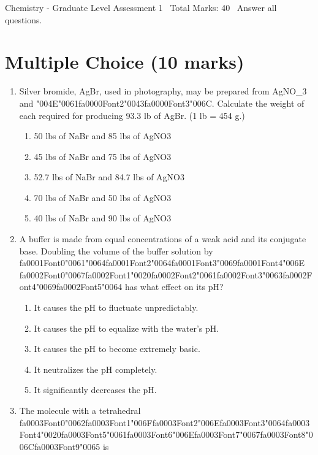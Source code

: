 \documentclass[12pt]{article}
\begin{document}
\begin{center}
Chemistry - Graduate Level Assessment 1 \
Total Marks: 40 \
Answer all questions.
\end{center}

\section*{Multiple Choice (10 marks)}
\begin{enumerate}[label=\arabic*.]
\item Silver bromide, AgBr, used in photography, may be prepared from AgNO\_3 and {\char"004E}{\char"0061}{\csname fa0000Font2\endcsname\char"0043}{\csname fa0000Font3\endcsname\char"006C}. Calculate
the weight of each required for producing 93.3 lb of AgBr. (1 lb = 454 g.)
\begin{enumerate}[label=(\alph*)]
    \item 50 lbs of NaBr and 85 lbs of AgNO3
    \item 45 lbs of NaBr and 75 lbs of AgNO3
    \item 52.7 lbs of NaBr and 84.7 lbs of AgNO3
    \item 70 lbs of NaBr and 50 lbs of AgNO3
    \item 40 lbs of NaBr and 90 lbs of AgNO3
\end{enumerate}
\item A buffer is made from equal concentrations of a weak acid and its conjugate base. Doubling
the volume of the buffer solution by {\csname fa0001Font0\endcsname\char"0061}{\char"0064}{\csname fa0001Font2\endcsname\char"0064}{\csname fa0001Font3\endcsname\char"0069}{\csname fa0001Font4\endcsname\char"006E} {\csname fa0002Font0\endcsname\char"0067}{\csname fa0002Font1\endcsname\char"0020}{\csname fa0002Font2\endcsname\char"0061}{\csname fa0002Font3\endcsname\char"0063}{\csname fa0002Font4\endcsname\char"0069}{\csname fa0002Font5\endcsname\char"0064} has what effect on its pH?
\begin{enumerate}[label=(\alph*)]
    \item It causes the pH to fluctuate unpredictably.
    \item It causes the pH to equalize with the water's pH.
    \item It causes the pH to become extremely basic.
    \item It neutralizes the pH completely.
    \item It significantly decreases the pH.
\end{enumerate}
\item The molecule with a tetrahedral {\csname fa0003Font0\endcsname\char"0062}{\csname fa0003Font1\endcsname\char"006F}{\csname fa0003Font2\endcsname\char"006E}{\csname fa0003Font3\endcsname\char"0064}{\csname fa0003Font4\endcsname\char"0020}{\csname fa0003Font5\endcsname\char"0061}{\csname fa0003Font6\endcsname\char"006E}{\csname fa0003Font7\endcsname\char"0067}{\csname fa0003Font8\endcsname\char"006C}{\csname fa0003Font9\endcsname\char"0065} is

\end{enumerate}
\end{document}

